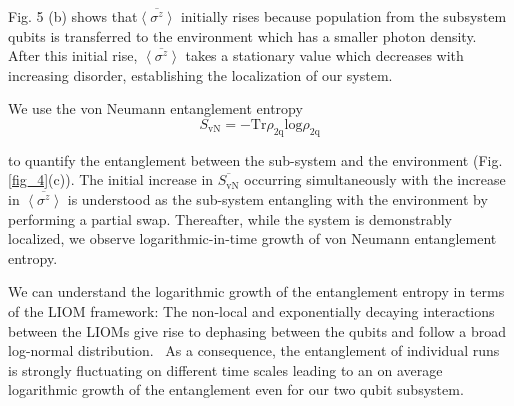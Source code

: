 
Fig. 5 (b) shows that$\overline{ \left< \sigma^z \right> }$ initially rises because population from the subsystem qubits is transferred to the environment which has a smaller photon density.
After this initial rise, $\overline{ \left< \sigma^z \right> }$ takes a stationary value which decreases with increasing disorder, establishing the localization of our system.

We use the von Neumann entanglement entropy
\begin{equation}
    S_{\text{vN}}=-\text{Tr} \rho_{\text{2q}} \text{log} \rho_{\text{2q}}
\end{equation}

\noindent to quantify the entanglement between the sub-system and the environment (Fig. \ref{fig_4}(c)).
The initial increase in $\overline{ S_{\text{vN}} }$ occurring simultaneously with the increase in $\overline{ \left< \sigma^z \right> }$ is understood as the sub-system entangling with the environment by performing a partial swap.
Thereafter, while the system is demonstrably localized, we observe logarithmic-in-time growth of von Neumann entanglement entropy.

We can understand the logarithmic growth of the entanglement entropy in terms of the LIOM framework: The non-local and exponentially decaying interactions between the LIOMs give rise to dephasing between the qubits and follow a broad log-normal distribution.~\autocite{Varma2019} As a consequence, the entanglement of individual runs is strongly fluctuating on different time scales leading to an on average logarithmic growth of the entanglement even for our two qubit subsystem.

